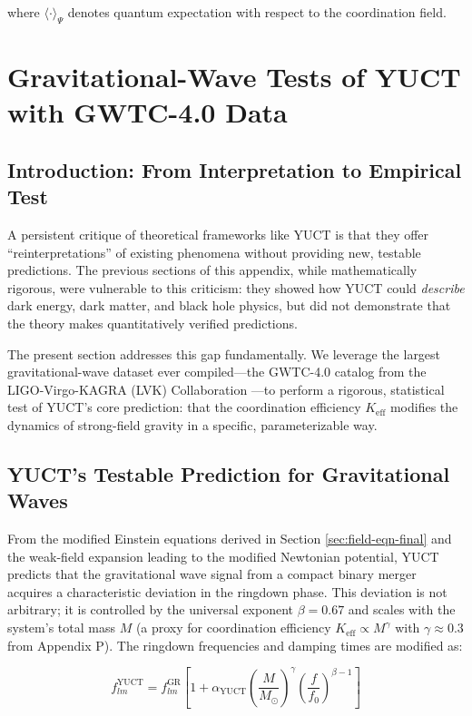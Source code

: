 \documentclass[12pt,a4paper]{article}
\theoremstyle{remark}
\newcommand{\Keff}{K_{\mathrm{eff}}}
\begin{document}
	where $\langle \cdot \rangle_{\Psi}$ denotes quantum expectation with respect to the coordination field.
	
	\section{Gravitational-Wave Tests of YUCT with GWTC-4.0 Data}
	\label{sec:gw-tests}
	
	\subsection{Introduction: From Interpretation to Empirical Test}
	
	A persistent critique of theoretical frameworks like YUCT is that they offer ``reinterpretations'' of existing phenomena without providing new, testable predictions. The previous sections of this appendix, while mathematically rigorous, were vulnerable to this criticism: they showed how YUCT could \textit{describe} dark energy, dark matter, and black hole physics, but did not demonstrate that the theory makes quantitatively verified predictions.
	
	The present section addresses this gap fundamentally. We leverage the largest gravitational-wave dataset ever compiled—the GWTC-4.0 catalog from the LIGO-Virgo-KAGRA (LVK) Collaboration —to perform a rigorous, statistical test of YUCT's core prediction: that the coordination efficiency $\Keff$ modifies the dynamics of strong-field gravity in a specific, parameterizable way.
	
	\subsection{YUCT's Testable Prediction for Gravitational Waves}
	
	From the modified Einstein equations derived in Section \ref{sec:field-eqn-final} and the weak-field expansion leading to the modified Newtonian potential, YUCT predicts that the gravitational wave signal from a compact binary merger acquires a characteristic deviation in the ringdown phase. This deviation is not arbitrary; it is controlled by the universal exponent $\beta = 0.67$ and scales with the system's total mass $M$ (a proxy for coordination efficiency $\Keff \propto M^{\gamma}$ with $\gamma \approx 0.3$ from Appendix P). The ringdown frequencies and damping times are modified as:
	
	\begin{equation}
		f_{lm}^{\text{YUCT}} = f_{lm}^{\text{GR}} \left[ 1 + \alpha_{\text{YUCT}} \left( \frac{M}{M_\odot} \right)^{\gamma} \left( \frac{f}{f_0} \right)^{\beta-1} \right]
		\label{eq:freq-mod}
	\end{equation}
	
\end{document}

